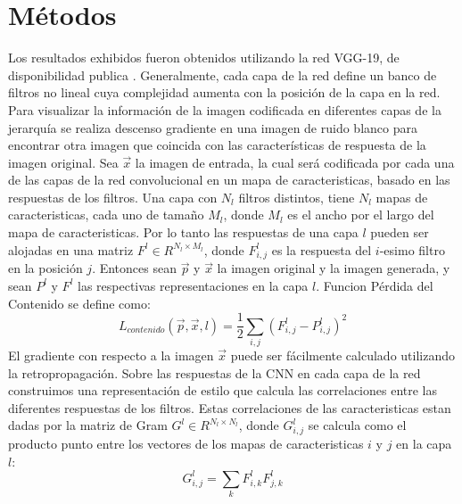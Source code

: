 \documentclass[a4paper,11pt,spanish]{book}
\begin{document}
    \section{Métodos \label{sec:metodos}}
      Los resultados exhibidos fueron obtenidos utilizando la red VGG-19, de disponibilidad publica \cite{SimonyanVGG}.
      Generalmente, cada capa de la red define un banco de filtros no lineal cuya complejidad aumenta con la posición de la capa en la red.
      Para visualizar la información de la imagen codificada en diferentes capas de la jerarquía se realiza descenso gradiente en una imagen de ruido blanco
      para encontrar otra imagen que coincida con las características de respuesta de la imagen original.
      Sea $\overrightarrow{x}$ la imagen de entrada, la cual será codificada por cada una de las capas de la red convolucional en un mapa de caracteristicas, basado en las respuestas de los filtros.
      Una capa con $N_l$ filtros distintos, tiene $N_l$ mapas de caracteristicas, cada uno de tamaño $M_l$, donde $M_l$ es el ancho por el largo del mapa de caracteristicas.
      Por lo tanto las respuestas de una capa $l$ pueden ser alojadas en una matriz $F^l \in R^{N_l \times M_l}$, donde $F_{i,j}^l$ es la respuesta del $i$-esimo filtro en la posición $j$.
      Entonces sean $\overrightarrow{p}$ y $\overrightarrow{x}$ la imagen original y la imagen generada, y sean $P^l$ y $F^l$ las respectivas representaciones en la capa $l$.
      Funcion Pérdida del Contenido se define como:
      \begin{equation}
       L_{contenido}(\overrightarrow{p},\overrightarrow{x}, l) = \frac{1}{2} \sum_{i,j} (F_{i,j}^l - P_{i,j}^l)^2
      \end{equation}
      El gradiente con respecto a la imagen $\overrightarrow{x}$ puede ser fácilmente calculado utilizando la retropropagación.
      Sobre las respuestas de la CNN en cada capa de la red construimos una representación de estilo que calcula las correlaciones entre las diferentes respuestas de los filtros.
      Estas correlaciones de las caracteristicas estan dadas por la matriz de Gram $G^l \in R^{N_l \times N_l}$, donde $G_{i,j}^l$ se calcula como el producto punto entre los vectores
      de los mapas de caracteristicas $i$ y $j$ en la capa $l$:
      \begin{equation}
	G_{i,j}^l = \sum_{k} F_{i,k}^l F_{j,k}^l
      \end{equation}
\end{document}
